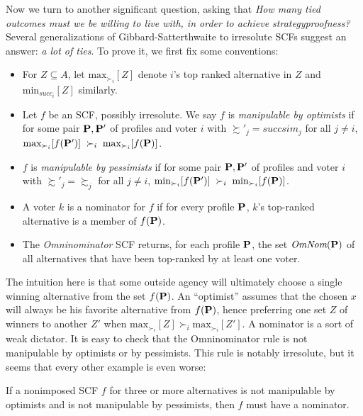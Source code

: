 Now we turn to another significant question, asking that \emph{How many tied outcomes must we be willing to live with, in order to achieve strategyproofness?} Several generalizations of Gibbard-Satterthwaite to irresolute SCFs suggest an answer: \emph{a lot of ties}. To prove it, we first fix some conventions:

\begin{definition}
    \begin{itemize}
        \item For $Z \subseteq A$, let $\mbox{max}_{\succ_i}[Z]$ denote $i$'s top ranked alternative in $Z$ and $\mbox{min}_{succ_i}[Z]$ similarly.
        \item Let $f$ be an SCF, possibly irresolute. We say $f$ is \emph{manipulable by optimists} if for some pair $\mathbf{P},\mathbf{P}'$ of profiles and voter $i$ with $\succsim'_j = succsim_j$ for all $j \neq i$, $\mbox{max}_{\succ_i} [f(\mathbf{P}')] \; \succ_i \; \mbox{max}_{\succ_i} [f(\mathbf{P})]$.
        \item $f$ is \emph{manipulable by pessimists} if for some pair $\mathbf{P},\mathbf{P}'$ of profiles and voter $i$ with $\succsim'_j = \succsim_j$ for all $j \neq i$, $\mbox{min}_{\succ_i} [f(\mathbf{P}')] \; \succ_i \; \mbox{min}_{\succ_i} [f(\mathbf{P})]$.
        \item A voter $k$ is a nominator for $f$ if for every profile $\mathbf{P}$, $k$'s top-ranked alternative is a member of $f(\mathbf{P})$.
        \item The \emph{Omninominator} SCF returns, for each profile $\mathbf{P}$, the set $\textit{OmNom}(\mathbf{P})$ of all alternatives that have been top-ranked by at least one voter.
    \end{itemize}
\end{definition}

The intuition here is that some outside agency will ultimately choose a single winning alternative from the set $f(\mathbf{P})$. An ``optimist'' assumes that the chosen $x$ will always be his favorite alternative from $f(\mathbf{P})$, hence preferring one set $Z$ of winners to another $Z'$ when $\mbox{max}_{\succ_i}[Z] \succ_i \mbox{max}_{\succ_i}[Z']$. A nominator is a sort of weak dictator. It is easy to check that the Omninominator rule is not manipulable by optimists or by pessimists. This rule is notably irresolute, but it seems that every other example is even worse:

\begin{theorem}
    \label{nominator}
    If a nonimposed SCF $f$ for three or more alternatives is not manipulable by optimists and is not manipulable by pessimists, then $f$ must have a nominator.
\end{theorem}

